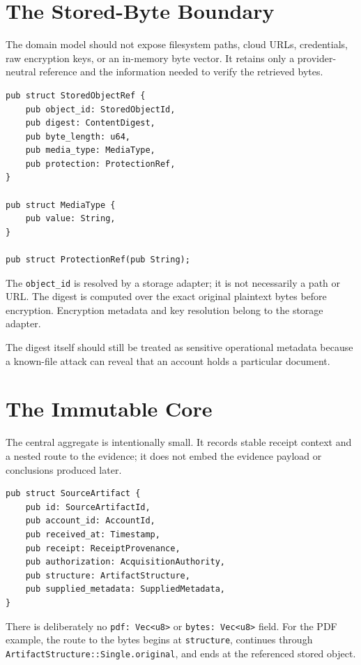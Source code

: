 \documentclass[11pt]{article}
\newcommand{\code}[1]{\texttt{#1}}
\begin{document}
\section{The Stored-Byte Boundary}

The domain model should not expose filesystem paths, cloud URLs, credentials, raw encryption keys, or an in-memory byte vector. It retains only a provider-neutral reference and the information needed to verify the retrieved bytes.

\begin{lstlisting}
pub struct StoredObjectRef {
    pub object_id: StoredObjectId,
    pub digest: ContentDigest,
    pub byte_length: u64,
    pub media_type: MediaType,
    pub protection: ProtectionRef,
}

pub struct MediaType {
    pub value: String,
}

pub struct ProtectionRef(pub String);
\end{lstlisting}

The \code{object\_id} is resolved by a storage adapter; it is not necessarily a path or URL. The digest is computed over the exact original plaintext bytes before encryption. Encryption metadata and key resolution belong to the storage adapter.

The digest itself should still be treated as sensitive operational metadata because a known-file attack can reveal that an account holds a particular document.

\section{The Immutable Core}

The central aggregate is intentionally small. It records stable receipt context and a nested route to the evidence; it does not embed the evidence payload or conclusions produced later.

\begin{lstlisting}
pub struct SourceArtifact {
    pub id: SourceArtifactId,
    pub account_id: AccountId,
    pub received_at: Timestamp,
    pub receipt: ReceiptProvenance,
    pub authorization: AcquisitionAuthority,
    pub structure: ArtifactStructure,
    pub supplied_metadata: SuppliedMetadata,
}
\end{lstlisting}

There is deliberately no \code{pdf: Vec<u8>} or \code{bytes: Vec<u8>} field. For the PDF example, the route to the bytes begins at \code{structure}, continues through \code{ArtifactStructure::Single.original}, and ends at the referenced stored object.
\end{document}

